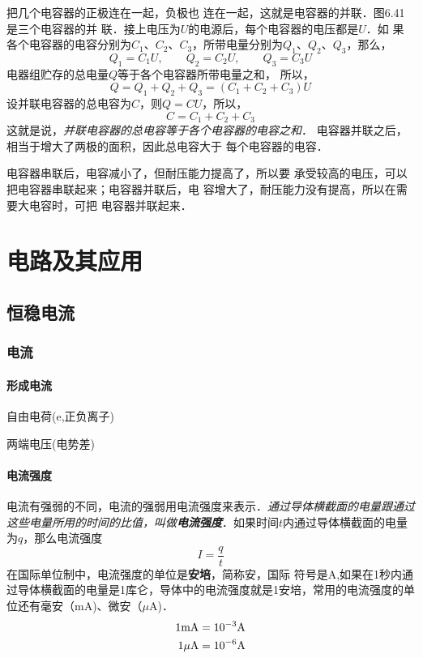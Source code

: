 \documentclass[10pt,cn]{elegantbook}
\begin{document}
   把几个电容器的正极连在一起，负极也
   连在一起，这就是电容器的并联．图6.41是三个电容器的并
   联．接上电压为$U$的电源后，每个电容器的电压都是$U$．如
   果各个电容器的电容分别为$C_1$、$C_2$、$C_3$，所带电量分别为$Q_1$、$Q_2$、$Q_3$，那么，
   \[Q_1=C_1U,\qquad Q_2=C_2U,\qquad Q_3=C_3U\]
   电器组贮存的总电量$Q$等于各个电容器所带电量之和，
   所以，
   \[Q=Q_1+Q_2+Q_3=(C_1+C_2+C_3)U\]
   设并联电容器的总电容为$C$，则$Q=CU$，所以，
   \[C=C_1+C_2+C_3\]
   这就是说，\textit{并联电容器的总电容等于各个电容器的电容之和}．
   电容器并联之后，相当于增大了两极的面积，因此总电容大于
   每个电容器的电容．
   
   电容器串联后，电容减小了，但耐压能力提高了，所以要
   承受较高的电压，可以把电容器串联起来；电容器并联后，电
   容增大了，耐压能力没有提高，所以在需要大电容时，可把
   电容器并联起来．
      
      \part{电路及其应用}
      
      \chapter{恒稳电流}
      
      \section{电流}
      
      \subsection{形成电流}
      
      自由电荷(e,正负离子)
      
       两端电压(电势差)
       
       \subsection{电流强度}
       
       电流有强弱的不同，电流的强弱用电流强度来表示．\textit{通过导体横截面的电量跟通过这些电量所用的时间的比值，叫做\textbf{电流强度}}．如果时间$t$内通过导体横截面的电量为$q$，那么电流强度
       \[I=\frac{q}{t} \]
       在国际单位制中，电流强度的单位是\textbf{安培}，简称安，国际
       符号是A,如果在1秒内通过导体横截面的电量是1库仑，导体中的电流强度就是1安培，常用的电流强度的单位还有毫安（mA)、微安（$\mu$A)．
       \[\begin{split}
       	1{\rm mA}&= 10^{-3}{\rm A}\\
       	1{\rm \mu A}&=10^{-6}{\rm A}
       \end{split}\]
       
\end{document}
